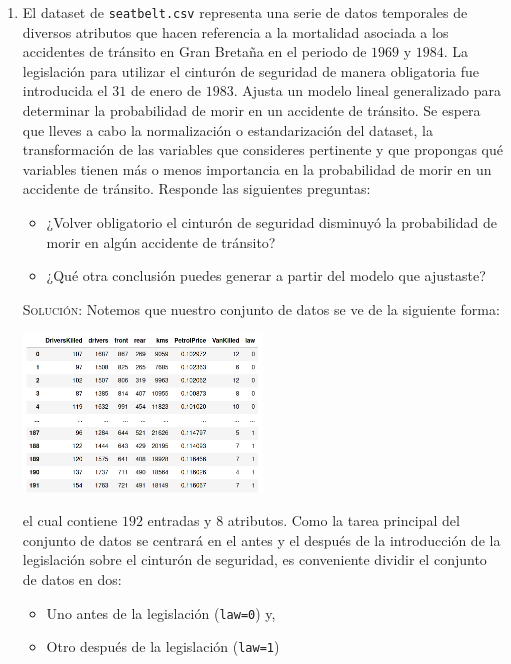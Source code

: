 \documentclass[letterpaper,11pt]{article}
\begin{document}
\begin{enumerate}
    \item El dataset de \texttt{seatbelt.csv} representa una serie de datos 
    temporales de diversos atributos que hacen referencia a la mortalidad 
    asociada a los accidentes de tránsito en Gran Bretaña en el periodo de 
    $1969$ y $1984$. La legislación para utilizar el cinturón de seguridad de 
    manera obligatoria fue introducida el $31$ de enero de $1983$. Ajusta un 
    modelo lineal generalizado para determinar la probabilidad de morir en 
    un accidente de tránsito. Se espera que lleves a cabo la normalización o 
    estandarización del dataset, la transformación de las variables que 
    consideres pertinente y que propongas qué variables tienen más o menos 
    importancia en la probabilidad de morir en un accidente de tránsito.
    Responde las siguientes preguntas:
    \begin{itemize}
        \item ¿Volver obligatorio el cinturón de seguridad disminuyó la 
        probabilidad de morir en algún accidente de tránsito?

        \item ¿Qué otra conclusión puedes generar a partir del modelo que 
        ajustaste?
    \end{itemize} 

    \textsc{Solución:} Notemos que nuestro conjunto de datos se ve de la 
    siguiente forma:
    \begin{center}
        \includegraphics[width=0.5\textwidth]{imagenes/seat1.png}
    \end{center}

    el cual contiene $192$ entradas y $8$ atributos. Como la tarea principal 
    del conjunto de datos se centrará en el antes y el después de la 
    introducción de la legislación sobre el cinturón de seguridad, es 
    conveniente dividir el conjunto de datos en dos: 
    \begin{itemize}
        \item Uno antes de la legislación (\texttt{law=0}) y, 
        \item Otro después de la legislación (\texttt{law=1})
    \end{itemize}


\end{enumerate}
\end{document}
